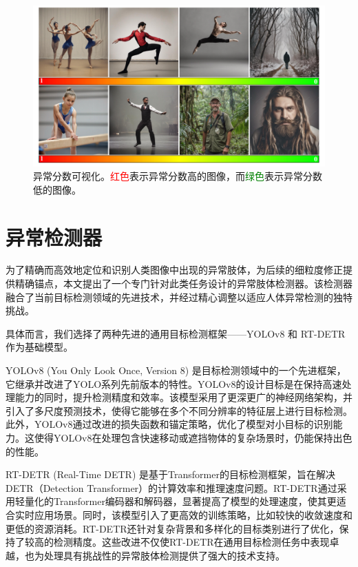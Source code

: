\begin{figure}[h]
    \centering
    \includegraphics[width=\linewidth]{fig/abnormal-score-visualize.pdf}
    \caption{异常分数可视化。\textcolor{red}{红色}表示异常分数高的图像，而\textcolor{green}{绿色}表示异常分数低的图像。}
    \label{fig:abnormal-score-visualize}
\end{figure}

\section{异常检测器} \label{sec:detector}
为了精确而高效地定位和识别人类图像中出现的异常肢体，为后续的细粒度修正提供精确锚点，本文提出了一个专门针对此类任务设计的异常肢体检测器。该检测器融合了当前目标检测领域的先进技术，并经过精心调整以适应人体异常检测的独特挑战。

具体而言，我们选择了两种先进的通用目标检测框架——YOLOv8 \cite{yolo_redmon2016you} 和 RT-DETR \cite{lv2023detrs} 作为基础模型。

YOLOv8 (You Only Look Once, Version 8) 是目标检测领域中的一个先进框架，它继承并改进了YOLO系列先前版本的特性。YOLOv8的设计目标是在保持高速处理能力的同时，提升检测精度和效率。该模型采用了更深更广的神经网络架构，并引入了多尺度预测技术，使得它能够在多个不同分辨率的特征层上进行目标检测。此外，YOLOv8通过改进的损失函数和锚定策略，优化了模型对小目标的识别能力。这使得YOLOv8在处理包含快速移动或遮挡物体的复杂场景时，仍能保持出色的性能。

RT-DETR (Real-Time DETR) 是基于Transformer的目标检测框架，旨在解决DETR（Detection Transformer）的计算效率和推理速度问题。RT-DETR通过采用轻量化的Transformer编码器和解码器，显著提高了模型的处理速度，使其更适合实时应用场景。同时，该模型引入了更高效的训练策略，比如较快的收敛速度和更低的资源消耗。RT-DETR还针对复杂背景和多样化的目标类别进行了优化，保持了较高的检测精度。这些改进不仅使RT-DETR在通用目标检测任务中表现卓越，也为处理具有挑战性的异常肢体检测提供了强大的技术支持。

